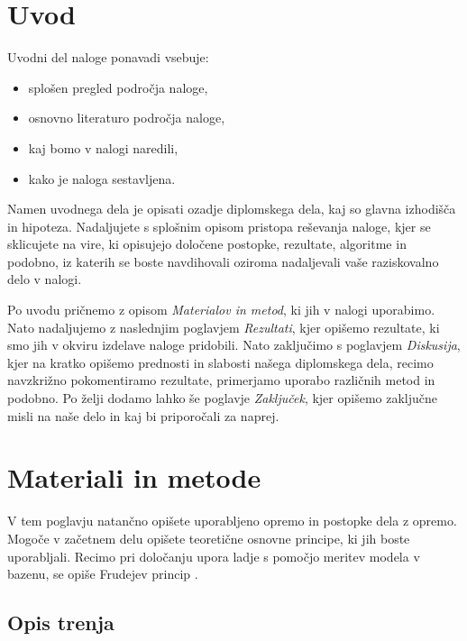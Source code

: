 \documentclass[pomnav, tisk]{fppreport}
\begin{document}
\section{Uvod}
\label{sec:Uvod}

Uvodni del naloge ponavadi vsebuje:

\begin{itemize}[nosep]
	\item splošen pregled področja naloge,
	\item osnovno literaturo področja naloge,
	\item kaj bomo v nalogi naredili,
	\item kako je naloga sestavljena.
\end{itemize}

Namen uvodnega dela je opisati ozadje diplomskega dela, kaj so glavna izhodišča in hipoteza. Nadaljujete s splošnim opisom pristopa reševanja naloge, kjer se sklicujete na vire, ki opisujejo določene postopke, rezultate, algoritme in podobno, iz katerih se boste navdihovali oziroma nadaljevali vaše raziskovalno delo v nalogi.

Po uvodu pričnemo z opisom \textit{Materialov in metod}, ki jih v nalogi uporabimo. Nato nadaljujemo z naslednjim poglavjem \textit{Rezultati}, kjer opišemo rezultate, ki smo jih v okviru izdelave naloge pridobili. Nato zaključimo s poglavjem \textit{Diskusija}, kjer na kratko opišemo prednosti in slabosti našega diplomskega dela, recimo navzkrižno pokomentiramo rezultate, primerjamo uporabo različnih metod in podobno. Po želji dodamo lahko še poglavje \textit{Zaključek}, kjer opišemo zaključne misli na naše delo in kaj bi priporočali za naprej.


\newpage
\section{Materiali in metode}
\label{sec:Materiali}

V tem poglavju natančno opišete uporabljeno opremo in postopke dela z opremo. Mogoče v začetnem delu opišete teoretične osnovne principe, ki jih boste uporabljali. Recimo pri določanju upora ladje s pomočjo meritev modela v bazenu, se opiše Frudejev princip \cite{froude1888resistance}.

\subsection{Opis trenja}
\end{document}
